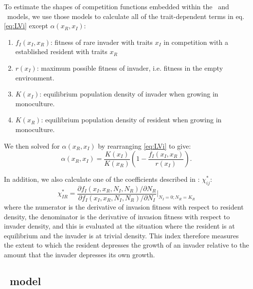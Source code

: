 \documentclass[a4paper,11pt]{article}
\begin{document}
To estimate the shapes of competition functions embedded within the
\Rstar\ and \plant\ models, we use those models to calculate all of
the trait-dependent terms in eq. \ref{eq:LVi} except $\alpha(x_R,
x_I)$:
\begin{enumerate}
\item $f_I(x_I, x_R)$: fitness of rare invader with traits $x_I$  in
  competition with a established resident with traits $x_R$
\item $r(x_I)$: maximum possible fitness of invader, i.e. fitness in
  the empty environment.
\item $K(x_I)$: equilibrium population density of invader when growing
  in monoculture.
\item $K(x_R)$: equilibrium population density of resident when
  growing in monoculture.
\end{enumerate}
We then solved for $\alpha(x_R, x_I)$ by rearranging  \ref{eq:LVi} to give:
\begin{equation}
  \label{eq:alpha}
  \alpha(x_R, x_I) = \frac{K(x_I)}{K(x_R)}
  \left(1 - \frac{f_I(x_I, x_R)}{r(x_I)}\right).
\end{equation}

In addition, we also calculate one of the coefficients described in
\citet{Abrams-2008}: $\chi_{ij}^{*}$:
%
\begin{equation}
  \label{eq:abrams-coef}
  \chi_{IR}^{*} =
  \frac{\partial f_I(x_I, x_R, N_I, N_R) /  \partial N_R}%
  {\partial f_I(x_I, x_R, N_I, N_R) / \partial N_I}
  \bigg|_{N_I=0; N_R=K_{R}}
\end{equation}
%
where the numerator is the derivative of invasion fitness with respect
to resident density, the denominator is the derivative of invasion
fitness with respect to invader density, and this is evaluated at the
situation where the resident is at equilibrium and the invader is at
trivial density.  This index therefore measures the extent to which
the resident depresses the growth of an invader relative to the amount
that the invader depresses its own growth.

\subsection{\Rstar\ model}

\end{document}
